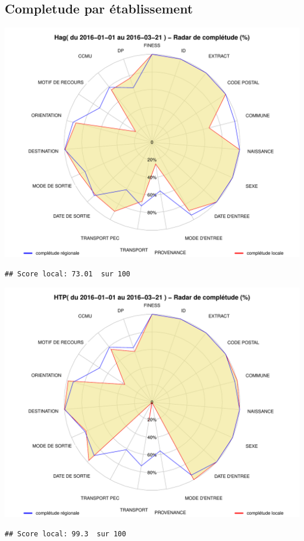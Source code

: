\documentclass[]{article}
\begin{document}
\subsection{Completude par
établissement}\label{completude-par-etablissement}

\includegraphics{completude_files/figure-latex/finess-1.pdf}

\begin{verbatim}
## Score local: 73.01  sur 100
\end{verbatim}

\includegraphics{completude_files/figure-latex/finess-2.pdf}

\begin{verbatim}
## Score local: 99.3  sur 100
\end{verbatim}
\end{document}
